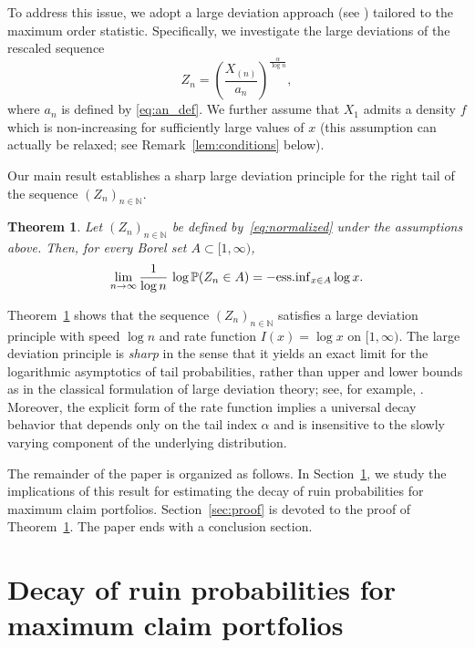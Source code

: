 \documentclass[11pt,reqno]{amsart}
\newtheorem{theorem}{Theorem}[section]
\theoremstyle{definition}
\theoremstyle{remark}
\numberwithin{equation}{section}
\newcommand{\essinf}{{\rm ess.inf}}
\newcommand{\PP}{\mathbb{P}}
\begin{document}
To address this issue, we adopt a large deviation approach (see \cite{dembo}) tailored to the
maximum order statistic. Specifically,  we investigate the large deviations of the rescaled sequence
\begin{equation}\label{eq:normalized}
Z_n
=
\left(\frac{X_{(n)}}{a_n}\right)^{\frac{\alpha}{\log n}},
\end{equation}
where $a_n$ is defined by \eqref{eq:an_def}. 
 We further assume that $X_1$ admits a density $f$ which is non-increasing for sufficiently large values of $x$ (this assumption can actually be relaxed; see Remark~\ref{lem:conditions} below).

Our main result establishes a sharp large deviation principle for the right tail of
the sequence $(Z_n)_{n\in\mathbb{N}}$.

\begin{theorem}\label{thm:main}
Let $(Z_n)_{n\in\mathbb{N}}$ be defined by~\eqref{eq:normalized} under the assumptions above. Then, for every Borel set $A \subset [1, \infty)$,
\begin{equation}\label{eq:LDP}
\lim_{n\to\infty}
\frac{1}{\log n}\,
\log \PP(Z_n \in A)
=
- \essinf_{x \in A} \log x.
\end{equation}
\end{theorem}

Theorem~\ref{thm:main} shows that the sequence $(Z_n)_{n\in\mathbb{N}}$
satisfies a large deviation principle with speed $\log n$ and  rate
function $I(x)=\log x$ on $[1,\infty)$. The large deviation principle is \emph{sharp} in the sense that it yields an
exact limit for the logarithmic asymptotics of tail probabilities, rather than
upper and lower bounds as in the classical formulation of large deviation
theory; see, for example, \cite{dembo}. Moreover, the explicit form of the rate
function implies a universal decay behavior that depends only on the tail index
$\alpha$ and is insensitive to the slowly varying component of the underlying
distribution. 
 
The remainder of the paper is organized as follows. In Section~\ref{sec:ruin}, we study the implications of this result for estimating the decay of ruin probabilities for maximum claim portfolios.  Section~\ref{sec:proof} is devoted to the proof of
Theorem~\ref{thm:main}. The paper ends with a conclusion section.


\section{Decay of ruin probabilities for maximum claim portfolios}
\label{sec:ruin}
\end{document}
